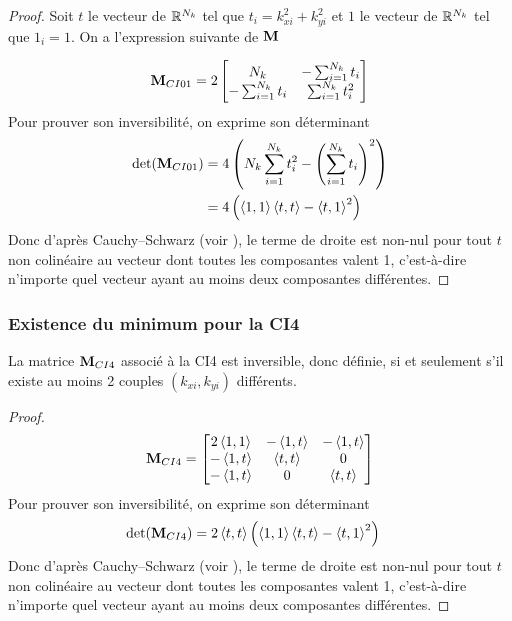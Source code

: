       \begin{proof}
        Soit \(t\) le vecteur de \(\mathbb R^{N_{k}}\) tel que \(t_i = k_{xi}^2 + k_{yi}^2\) et \(1\) le vecteur de \(\mathbb R^{N_{k}}\) tel que \(1_i = 1\). On a l'expression suivante de \({\mathbf{M}}\)

        \begin{equation*}
          {\mathbf{M}}_{CI01} = 2\begin{bmatrix}
          N_{k} & -\sum_{i=1}^{N_{k}} t_i
          \\
          -\sum_{i=1}^{N_{k}} t_i & \sum_{i=1}^{N_{k}} t_i^2
          \end{bmatrix}
        \end{equation*}
        Pour prouver son inversibilité, on exprime son déterminant 
        \begin{align*}
          \det( {\mathbf{M}}_{CI01}) &= 4\left(N_{k}\sum_{i=1}^{N_{k}} t_i^2 - \left( \sum_{i=1}^{N_{k}} t_i\right)^2\right)
          \\
           &= 4\left( \left<{1},{1}\right>\left<{t},{t}\right> - \left<{t},{1}\right>^2\right)
        \end{align*}
        Donc d'après Cauchy–Schwarz (voir \cite[\href{https://dlmf.nist.gov/1.7\#E1}{eq.~1.7.1}]{dlmf_nist_2019}), le terme de droite est non-nul pour tout \(t\) non colinéaire au vecteur dont toutes les composantes valent 1, c'est-à-dire n'importe quel vecteur ayant au moins deux composantes différentes.
      \end{proof}

    \subsubsection{Existence du minimum pour la CI4}

      \begin{prop}
        La matrice \({\mathbf{M}}_{CI4}\) associé à la CI4 est inversible, donc définie, si et seulement s'il existe au moins 2 couples \((k_{xi},k_{yi})\) différents.
      \end{prop}

      \begin{proof}
        \begin{equation*}
          {\mathbf{M}}_{CI4} = \begin{bmatrix}
          2\left<{1},{1}\right> & -\left<{1},{t}\right> & -\left<{1},{t}\right>
          \\
          -\left<{1},{t}\right> & \left<{t},{t}\right>  & 0
          \\
          -\left<{1},{t}\right> & 0          & \left<{t},{t}\right>
          \end{bmatrix}
        \end{equation*}
        Pour prouver son inversibilité, on exprime son déterminant 
        \begin{align*}
          \det({\mathbf{M}}_{CI4}) &= 2\left<{t},{t}\right>\left( \left<{1},{1}\right>\left<{t},{t}\right> - \left<{t},{1}\right>^2\right)
        \end{align*}
        Donc d'après Cauchy–Schwarz (voir \cite[\href{https://dlmf.nist.gov/1.7\#E1}{eq.~1.7.1}]{dlmf_nist_2019}), le terme de droite est non-nul pour tout \(t\) non colinéaire au vecteur dont toutes les composantes valent 1, c'est-à-dire n'importe quel vecteur ayant au moins deux composantes différentes.
      \end{proof}

